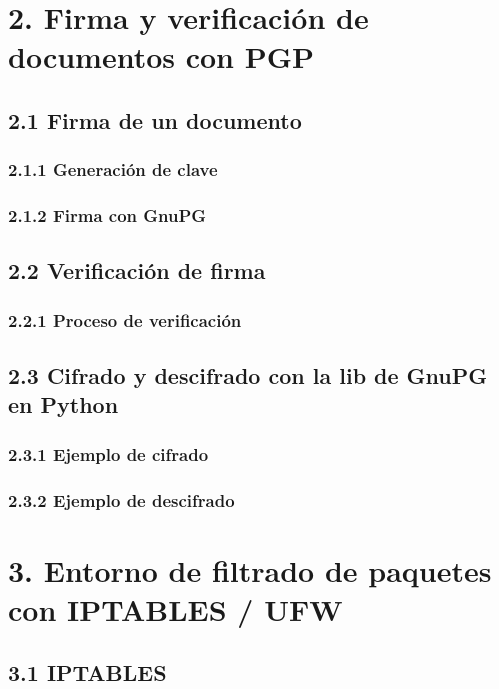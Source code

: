 \documentclass[12pt,a4paper]{article}
\begin{document}
\section{2. Firma y verificación de documentos con PGP}
\subsection{2.1 Firma de un documento}
\subsubsection{2.1.1 Generación de clave}

\subsubsection{2.1.2 Firma con GnuPG}

\subsection{2.2 Verificación de firma}
\subsubsection{2.2.1 Proceso de verificación}

\subsection{2.3 Cifrado y descifrado con la lib de GnuPG en Python}
\subsubsection{2.3.1 Ejemplo de cifrado}

\subsubsection{2.3.2 Ejemplo de descifrado}

\section{3. Entorno de filtrado de paquetes con IPTABLES / UFW}
\subsection{3.1 IPTABLES}
\end{document}
